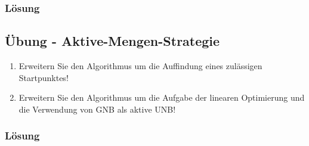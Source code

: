 \subsubsection{Lösung} 

\subsection*{Übung - Aktive-Mengen-Strategie}
\label{sec:uebung_kapitel_1_ams} 
\begin{enumerate}[label=\alph*)]
  \item Erweitern Sie den Algorithmus um die Auffindung eines zulässigen Startpunktes!
  \item Erweitern Sie den Algorithmus um die Aufgabe der linearen Optimierung und die Verwendung von GNB als aktive UNB!
\end{enumerate}

\subsubsection{Lösung} 
